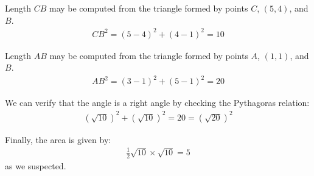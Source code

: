 \documentclass[12pt]{article}
\begin{document}
Length $CB$ may be computed from the triangle formed by points $C$, $(5,4)$, and $B$.
\begin{align*}
CB^2 = (5-4)^2 + (4-1)^2 = 10
\end{align*}

Length $AB$ may be computed from the triangle formed by points $A$, $(1,1)$, and $B$.
\begin{align*}
AB^2 = (3-1)^2 + (5-1)^2 = 20
\end{align*}

We can verify that the angle is a right angle by checking the Pythagoras relation:
\begin{align*}
(\sqrt{10})^2 + (\sqrt{10})^2  = 20 = (\sqrt{20})^2 
\end{align*}

Finally, the area is given by:
\begin{align*}
\frac{1}{2} \sqrt{10} \times \sqrt{10}  = 5
\end{align*}
as we suspected. 




\newpage
\end{document}
